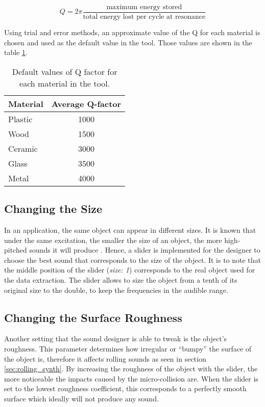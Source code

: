 \begin{equation}\label{eq:Qfactor}
Q=2\pi \frac{\mbox{maximum energy stored}}{\mbox{total energy lost per cycle at resonance}}
\end{equation}

Using trial and error methods, an approximate value of the \gls{Q} for each material is chosen and used as the default value in the tool. Those values are shown in the table \ref{tab:default_Q}.

\begin{table}[H]
	\centering
    \begin{tabular}{ l  c }
    \toprule
    \textbf{Material} & \textbf{Average Q-factor} \\
    \toprule 
    Plastic & 1000 \\ 
    Wood & 1500 \\ 
    Ceramic & 3000 \\ 
    Glass & 3500 \\ 
    Metal & 4000 \\
    \bottomrule
    \end{tabular}
    \caption{Default values of \gls{Q} factor for each material in the tool.}
    \label{tab:default_Q}
\end{table} 

\subsection{Changing the Size}
In an application, the same object can appear in different sizes. It is known that under the same excitation, the smaller the size of an object, the more high-pitched sounds it will produce \cite{gaver1993world}. Hence, a slider is implemented for the designer to choose the best sound that corresponds to the size of the object. It is to note that the middle position of the slider (\textit{size: 1}) corresponds to the real object used for the data extraction. The slider allows to size the object from a tenth of its original size to the double, to keep the frequencies in the audible range.

\subsection{Changing the Surface Roughness}
Another setting that the sound designer is able to tweak is the object's roughness. This parameter determines how irregular or ``bumpy'' the surface of the object is, therefore it affects rolling sounds as seen in section \ref{sec:rolling_synth}. By increasing the roughness of the object with the slider, the more noticeable the impacts caused by the micro-collision are. When the slider is set to the lowest roughness coefficient, this corresponds to a perfectly smooth surface which ideally will not produce any sound.


